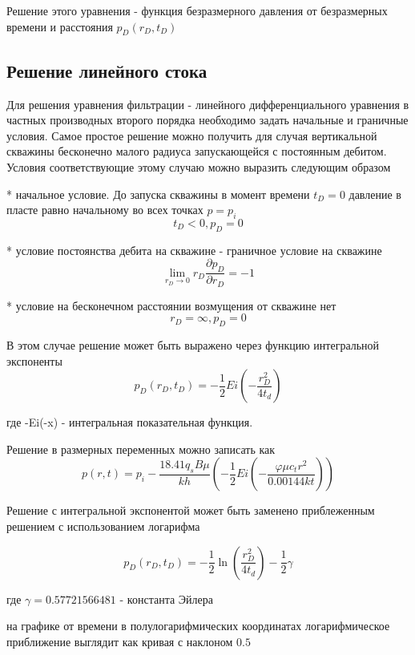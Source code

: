 \documentclass[a4paper,12pt]{article}
\begin{document}
	Решение этого уравнения - функция безразмерного давления от безразмерных времени и расстояния $p_D(r_D, t_D) $
	
	\subsection{Решение линейного стока} 
	
	Для решения уравнения фильтрации - линейного дифференциального уравнения в частных производных второго порядка необходимо задать начальные и граничные условия.
	Самое простое решение можно получить для случая вертикальной скважины бесконечно малого радиуса запускающейся с постоянным дебитом. Условия соответствующие этому случаю можно выразить следующим образом
	
	* начальное условие. До запуска скважины в момент времени  $t_D = 0$ давление в пласте равно начальному во всех точках $p=p_i$
	$$ t_D < 0, p_D = 0$$
	
	* условие постоянства дебита на скважине - граничное условие на скважине
	$$ \lim_{r_D \to 0} {r_D \frac{\partial p_D}{\partial r_D}} = -1 $$
	
	* условие на бесконечном расстоянии возмущения от скважине нет
	$$ r_D = \infty, p_D = 0 $$
	
	В этом случае решение может быть выражено через функцию интегральной экспоненты
	$$ p_D(r_D,t_D) = - \frac{1}{2} Ei \left(- \dfrac{ r_D^2}{4t_d} \right) $$
	
	где -Ei(-x) - интегральная показательная функция.
	
	Решение в размерных переменных можно записать как
	$$
	p\left(r,t\right)=p_i-\frac{18.41q_sB\mu}{kh}\left(-\frac{1}{2} Ei \left(-\frac{\varphi\mu c_tr^2}{0.00144kt}\right)\right) 
	$$
	
	
	Решение с интегральной экспонентой может быть заменено приблеженным решением с использованием логарифма 
	
	$$ 
	p_D(r_D,t_D) = - \frac{1}{2} \ln \left( \dfrac{ r_D^2}{4t_d} \right) - \frac{1}{2}\gamma 
	$$
	
	где $\gamma = 0.57721566481$ - константа Эйлера
	
	на графике от времени в полулогарифмических координатах логарифмическое приближение выглядит как кривая с наклоном $0.5$
	
\end{document}
